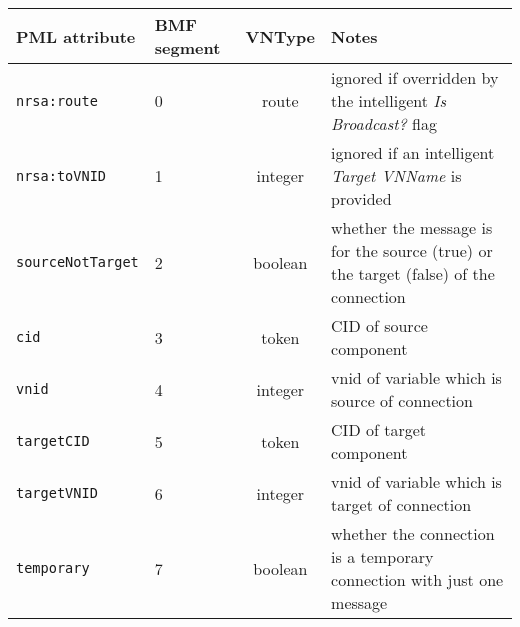 \documentclass[pdftex,a4paper]{article}
\newcommand{\XMLfont}[1]{{\tt \small #1}}
\begin{document}
\begin{table}[!h]
  \begin{center}
    \label{tab:CreateLink}
    \begin{tabular}{|l|p{13mm}|c|p{60mm}|}
      \hline

      \textbf{PML attribute} & \textbf{BMF segment} & \textbf{VNType}
      & \textbf{Notes} \\\hline

      \XMLfont{nrsa:route} & 0 & route & ignored if overridden by the
      intelligent {\em Is Broadcast?} flag \\\hline

      \XMLfont{nrsa:toVNID} & 1 & integer & ignored if an intelligent {\em
      Target VNName} is provided \\\hline

      \XMLfont{sourceNotTarget} & 2 & boolean & whether the message is
      for the source (true) or the target (false) of the connection
      \\\hline

      \XMLfont{cid} & 3 & token & CID of source component
      \\\hline

      \XMLfont{vnid} & 4 & integer & vnid of variable which is source
      of connection \\\hline


      \XMLfont{targetCID} & 5 & token & CID of target component
      \\\hline

      \XMLfont{targetVNID} & 6 & integer & vnid of variable which is
      target of connection \\\hline



      \XMLfont{temporary} & 7 & boolean & whether the connection
      is a temporary connection with just one message \\\hline

    \end{tabular}
  \end{center}
\end{table}
\end{document}
